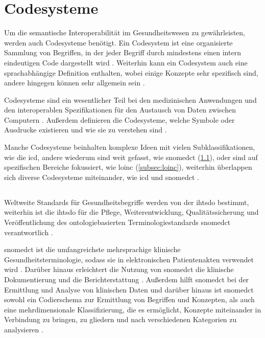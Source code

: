 \section{Codesysteme} \label{sec:codesys}

Um die semantische Interoperabilität im Gesundheitswesen zu gewährleisten, werden auch Codesysteme benötigt. Ein Codesystem ist eine organisierte Sammlung von Begriffen, in der jeder Begriff durch mindestens einen intern eindeutigen Code dargestellt wird \cite{bluecodesy}. Weiterhin kann ein Codesystem auch eine sprachabhängige Definition enthalten, wobei einige Konzepte sehr spezifisch sind, andere hingegen können sehr allgemein sein \cite{interop, bluecodesy}.

Codesysteme sind ein wesentlicher Teil bei den medizinischen Anwendungen und den interoperablen Spezifikationen für den Austausch von Daten zwischen Computern \cite{interop}. Außerdem definieren die Codesysteme, welche Symbole oder Ausdrucke existieren und wie sie zu verstehen sind \cite{interop, fhircodesys}.

Manche Codesysteme beinhalten komplexe Ideen mit vielen Subklassifikationen, wie die \ac{icd}, andere wiederum sind weit gefasst, wie \ac{snomedct} (\ref{subsec:snomed}), oder sind auf spezifischen Bereiche fokussiert, wie \ac{loinc} (\ref{subsec:loinc}), weiterhin überlappen sich diverse Codesysteme miteinander, wie \ac{icd} und \ac{snomedct} \cite{bluecodesy}.

\subsection{} \label{subsec:snomed}

Weltweite Standards für Gesundheitsbegriffe werden von der \ac{ihtsdo} bestimmt, weiterhin ist die \ac{ihtsdo} für die Pflege, Weiterentwicklung, Qualitätssicherung und Veröffentlichung des ontologiebasierten Terminologiestandards \ac{snomedct} verantwortlich \cite{snomedofic}. 

\acf{snomedct} ist die umfangreichste mehrsprachige klinische Gesundheitsterminologie, sodass sie in elektronischen Patientenakten verwendet wird \cite{telemedizin, interop}. Darüber hinaus erleichtert die Nutzung von \ac{snomedct} die klinische Dokumentierung und die Berichterstattung \cite{telemedizin}. Außerdem hilft \ac{snomedct} bei der Ermittlung und Analyse von klinischen Daten und darüber hinaus ist \ac{snomedct} sowohl ein Codierschema zur Ermittlung von Begriffen und Konzepten, als auch eine mehrdimensionale Klassifizierung, die es ermöglicht, Konzepte miteinander in Verbindung zu bringen, zu gliedern und nach verschiedenen Kategorien zu analysieren \cite{interop}. 

